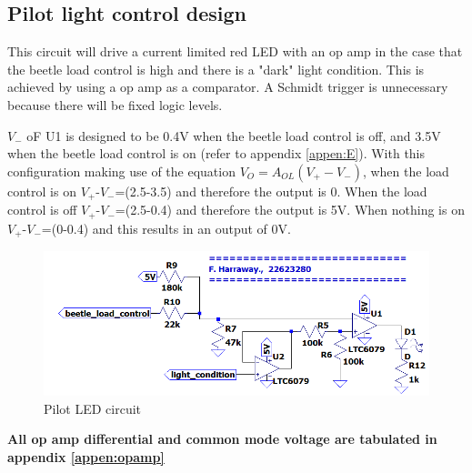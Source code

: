 \subsection{Pilot light control design}

This circuit will drive a current limited red LED with an op amp in the case that the beetle load control is high and there is a "dark" light condition. This is achieved by using a op amp as a comparator. A Schmidt trigger is unnecessary because there will be fixed logic levels. 

 $V_-$  oF U1 is designed to be 0.4V when the beetle load control is off, and 3.5V when the beetle load control is on (refer to appendix \ref{appen:E}). With this configuration making use of the equation $V_O=A_{OL}(V_+-V_-)$, when the load control is on $V_+$-$V_-$=(2.5-3.5) and therefore the output is 0. When the load control is off  $V_+$-$V_-$=(2.5-0.4) and therefore the output is 5V. When nothing is on  $V_+$-$V_-$=(0-0.4) and this results in an output of 0V.
\begin{figure}[!htb]
	\centering
	\includegraphics[width=0.55\linewidth]{Figures/A7/pilotLED.png}
	\caption{Pilot LED circuit}
	\label{fig:pilot}
\end{figure}


\textbf{All op amp differential and common mode voltage are tabulated in appendix \ref{appen:opamp}}



